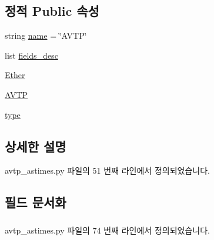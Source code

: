 \subsection*{정적 Public 속성}
\begin{DoxyCompactItemize}
\item 
string \hyperlink{classavtp__astimes_1_1_a_v_t_p_a8ccf841cb59e451791bcb2e1ac4f1edc}{name} = \char`\"{}A\+V\+TP\char`\"{}
\item 
list \hyperlink{classavtp__astimes_1_1_a_v_t_p_ae9f6e6e337ffed950ec570abe47e4057}{fields\+\_\+desc}
\item 
\hyperlink{classavtp__astimes_1_1_a_v_t_p_afa5e858f45c827c0008d672a6c84292f}{Ether}
\item 
\hyperlink{classavtp__astimes_1_1_a_v_t_p_aa3020d4b859c4ec1cff8fa88efc6fe38}{A\+V\+TP}
\item 
\hyperlink{classavtp__astimes_1_1_a_v_t_p_a7aead736a07eaf25623ad7bfa1f0ee2d}{type}
\end{DoxyCompactItemize}


\subsection{상세한 설명}


avtp\+\_\+astimes.\+py 파일의 51 번째 라인에서 정의되었습니다.



\subsection{필드 문서화}
\subsubsection[{\texorpdfstring{A\+V\+TP}{AVTP}}]{\hspace{0.3cm}{\ttfamily [static]}}\hypertarget{classavtp__astimes_1_1_a_v_t_p_aa3020d4b859c4ec1cff8fa88efc6fe38}{}\label{classavtp__astimes_1_1_a_v_t_p_aa3020d4b859c4ec1cff8fa88efc6fe38}


avtp\+\_\+astimes.\+py 파일의 74 번째 라인에서 정의되었습니다.

